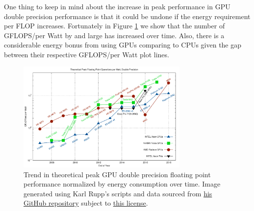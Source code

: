 One thing to keep in mind about the increase in peak performance in GPU double precision performance is that it could be undone if the energy requirement per FLOP increases. Fortunately in Figure \ref{GPUFP64FlopsPerWattTrends.fig} we show that the number of GFLOPS/per Watt by and large has increased over time. Also, there is a considerable energy bonus from using GPUs comparing to CPUs given the gap between their respective GFLOPS/per Watt plot lines.

\begin{figure}[htbp!]
    \centering
    \includegraphics[width=0.75\textwidth]{figures/L24/gflops-per-watt-dp.pdf}
    \caption{Trend in theoretical peak GPU double precision floating point performance normalized by energy consumption over time. Image generated using Karl Rupp's scripts and data sourced from \href{https://github.com/karlrupp/cpu-gpu-mic-comparison}{his GitHub repository} subject to \href{https://github.com/karlrupp/cpu-gpu-mic-comparison/blob/master/LICENSE.txt}{this license}. }
    \label{GPUFP64FlopsPerWattTrends.fig}
\end{figure}

